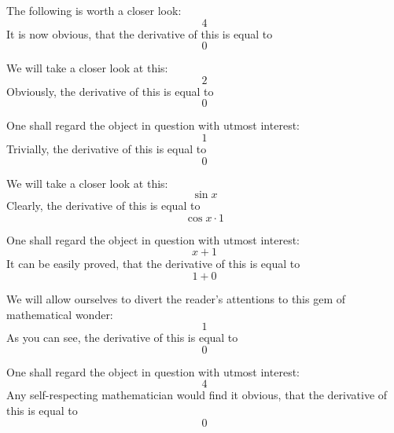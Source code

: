\documentclass{article}
\begin{document}
The following is worth a closer look:
\begin{equation}
4 
\end{equation}
It is now obvious, that the derivative of this is equal to
\begin{equation}
0 
\end{equation}

We will take a closer look at this:
\begin{equation}
2 
\end{equation}
Obviously, the derivative of this is equal to
\begin{equation}
0 
\end{equation}

One shall regard the object in question with utmost interest:
\begin{equation}
1 
\end{equation}
Trivially, the derivative of this is equal to
\begin{equation}
0 
\end{equation}

We will take a closer look at this:
\begin{equation}
\sin x 
\end{equation}
Clearly, the derivative of this is equal to
\begin{equation}
\cos x \cdot 1 
\end{equation}

One shall regard the object in question with utmost interest:
\begin{equation}
x + 1 
\end{equation}
It can be easily proved, that the derivative of this is equal to
\begin{equation}
1 + 0 
\end{equation}

We will allow ourselves to divert the reader's attentions to this gem of mathematical wonder:
\begin{equation}
1 
\end{equation}
As you can see, the derivative of this is equal to
\begin{equation}
0 
\end{equation}

One shall regard the object in question with utmost interest:
\begin{equation}
4 
\end{equation}
Any self-respecting mathematician would find it obvious, that the derivative of this is equal to
\begin{equation}
0 
\end{equation}
\end{document}
